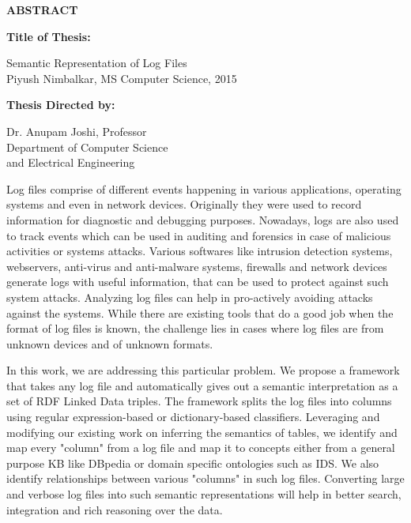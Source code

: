 \newpage
\pagestyle{empty}

\begin{center}
\vspace{0.1in}
\large{\bf ABSTRACT} \par  
\bigskip \bigskip
\end{center}

{\bf Title of Thesis:} \parbox[t]{4.5in}{{Semantic Representation of Log Files\\
Piyush Nimbalkar, MS Computer Science, 2015\\}}
\begin{singlespace}
{\bf Thesis Directed by:}{\hspace{2.5mm}} \parbox[t]{3in}{Dr. Anupam Joshi, Professor\\
Department of Computer Science\\ 
and Electrical Engineering\\}
\end{singlespace}

Log files comprise of different events happening in various applications, operating systems and even in network devices. Originally they were used to record information for diagnostic and debugging purposes. Nowadays, logs are also used to track events which can be used in auditing and forensics in case of malicious activities or systems attacks. Various softwares like intrusion detection systems, webservers, anti-virus and anti-malware systems, firewalls and network devices generate logs with useful information, that can be used to protect against such system attacks. Analyzing log files can help in pro-actively avoiding attacks against the systems. While there are existing tools that do a good job when the format of log files is known, the challenge lies in cases where log files are from unknown devices and of unknown formats.

In this work, we are addressing this particular problem. We propose a framework that takes any log file and automatically gives out a semantic interpretation as a set of RDF Linked Data triples. The framework splits the log files into columns using regular expression-based or dictionary-based classifiers. Leveraging and modifying our existing work on inferring the semantics of tables, we identify and map every "column" from a log file and map it to concepts either from a general purpose KB like DBpedia or domain specific ontologies such as IDS. We also identify relationships between various "columns" in such log files. Converting large and verbose log files into such semantic representations will help in better search, integration and rich reasoning over the data.

\par\vfil

